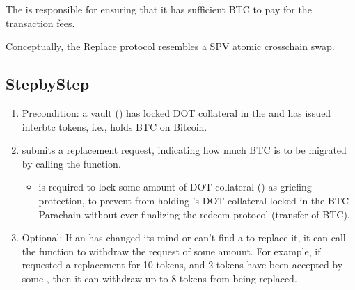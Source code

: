 \documentclass[a4paper,10pt,english]{sphinxmanual}
\begin{document}
The  is responsible for ensuring that it has sufficient BTC to pay for the transaction fees.

Conceptually, the Replace protocol resembles a SPV atomic cross\sphinxhyphen{}chain swap.


\subsection{Step\sphinxhyphen{}by\sphinxhyphen{}Step}
\label{\detokenize{spec/replace:step-by-step}}\begin{enumerate}
%
\item {} 
Precondition: a vault () has locked DOT collateral in the  and has issued interbtc tokens, i.e., holds BTC on Bitcoin.

\item {} 
 submits a replacement request, indicating how much BTC is to be migrated by calling the {\hyperref[\detokenize{spec/replace:requestreplace}]{}} function.
\begin{itemize}
\item {} 
 is required to lock some amount of DOT collateral ({\hyperref[\detokenize{spec/fee:replacegriefingcollateral}]{}}) as griefing protection, to prevent  from holding ’s DOT collateral locked in the BTC Parachain without ever finalizing the redeem protocol (transfer of BTC).

\end{itemize}

\item {} 
Optional: If an  has changed its mind or can’t find a  to replace it, it can call the {\hyperref[\detokenize{spec/replace:withdrawreplacerequest}]{}} function to withdraw the request of some amount. For example, if  requested a replacement for 10 tokens, and 2 tokens have been accepted by some , then it can withdraw up to 8 tokens from being replaced.


\end{enumerate}
\end{document}
